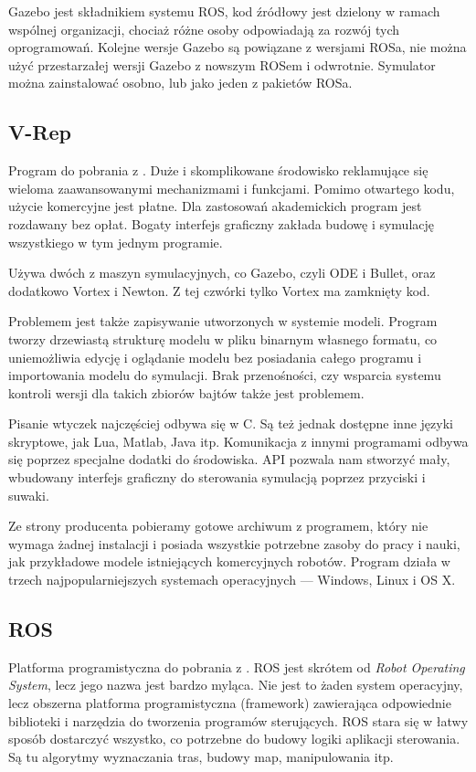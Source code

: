 Gazebo jest składnikiem systemu ROS, kod źródłowy jest dzielony w ramach wspólnej organizacji, chociaż różne osoby odpowiadają za rozwój tych oprogramowań.
Kolejne wersje Gazebo są powiązane z wersjami ROSa, nie można użyć przestarzałej wersji Gazebo z nowszym ROSem i odwrotnie.
Symulator można zainstalować osobno, lub jako jeden z pakietów ROSa.

\subsection{V-Rep}
Program do pobrania z \cite{vrep_website}. Duże i skomplikowane środowisko reklamujące się wieloma zaawansowanymi mechanizmami i funkcjami.
Pomimo otwartego kodu, użycie komercyjne jest płatne. Dla zastosowań akademickich program jest rozdawany bez opłat.
Bogaty interfejs graficzny zakłada budowę i symulację wszystkiego w tym jednym programie.

Używa dwóch z maszyn symulacyjnych, co Gazebo, czyli ODE i Bullet, oraz dodatkowo Vortex i Newton. Z tej czwórki tylko Vortex ma zamknięty kod.

Problemem jest także zapisywanie utworzonych w systemie modeli.
Program tworzy drzewiastą strukturę modelu w pliku binarnym własnego formatu, co uniemożliwia edycję i oglądanie modelu bez posiadania całego programu i importowania modelu do symulacji.
Brak przenośności, czy wsparcia systemu kontroli wersji dla takich zbiorów bajtów także jest problemem.

Pisanie wtyczek najczęściej odbywa się w C. Są też jednak dostępne inne języki skryptowe, jak Lua, Matlab, Java itp.
Komunikacja z innymi programami odbywa się poprzez specjalne dodatki do środowiska.
API pozwala nam stworzyć mały, wbudowany interfejs graficzny do sterowania symulacją poprzez przyciski i suwaki.

Ze strony producenta pobieramy gotowe archiwum z programem, który nie wymaga żadnej instalacji i posiada wszystkie potrzebne zasoby do pracy i nauki, jak przykładowe modele istniejących komercyjnych robotów.
Program działa w trzech najpopularniejszych systemach operacyjnych --- Windows, Linux i OS X.

\subsection{ROS}
Platforma programistyczna do pobrania z \cite{ros_website}.
ROS jest skrótem od \emph{Robot Operating System}, lecz jego nazwa jest bardzo myląca.
Nie jest to żaden system operacyjny, lecz obszerna platforma programistyczna (framework) zawierająca odpowiednie biblioteki i narzędzia do tworzenia programów sterujących.
ROS stara się w łatwy sposób dostarczyć wszystko, co potrzebne do budowy logiki aplikacji sterowania.
Są tu algorytmy wyznaczania tras, budowy map, manipulowania itp. 

